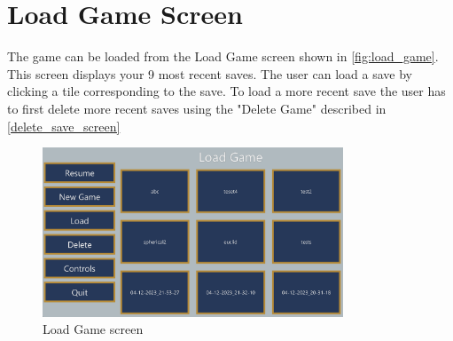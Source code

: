 \section{Load Game Screen}
The game can be loaded from the Load Game screen shown in \autoref{fig:load_game}.
This screen displays your 9 most recent saves.
The user can load a save by clicking a tile corresponding to the save.
To load a more recent save the user has to first delete more recent saves using the "Delete Game" described in \autoref{delete_save_screen}

\begin{figure}[h]
    \centering
    \includegraphics[width=0.8\textwidth]{chapters/user_manual/resources/load-game.png}
    \caption{Load Game screen}
    \label{fig:load_game}
\end{figure}